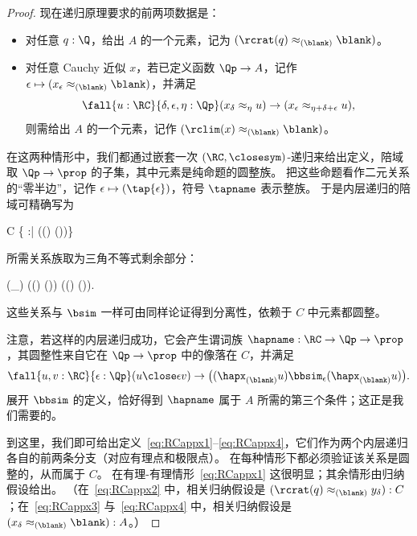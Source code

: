 \begin{proof}
  现在递归原理要求的前两项数据是：
  \begin{itemize}
  \item 对任意 $q:\Q$，给出 $A$ 的一个元素，记为 $(\rcrat(q)\approx_{(\blank)} \blank)$。
  \item 对任意 Cauchy 近似 $x$，若已定义函数 $\Qp \to A$，记作 $\epsilon \mapsto (x_\epsilon \approx_{(\blank)} \blank)$，并满足
    \begin{equation}
      \fall{u:\RC}{\delta,\epsilon,\eta:\Qp} (x_\delta \approx_\eta u) \to (x_\epsilon \approx_{\eta+\delta+\epsilon} u),\label{eq:appxrec2}
    \end{equation}
    则需给出 $A$ 的一个元素，记作 $(\rclim(x)\approx_{(\blank)} \blank)$。
  \end{itemize}
  在这两种情形中，我们都通过嵌套一次 $(\RC,\closesym)$-递归来给出定义，陪域取 $\Qp\to\prop$ 的子集，其中元素是纯命题的圆整族。
  把这些命题看作二元关系的“零半边”，记作 $\epsilon \mapsto (\tap{\epsilon})$，符号 $\tapname$ 表示整族。
  于是内层递归的陪域可精确写为
  \begin{narrowmultline*}
    C 
    \bigg\{ \tapname :\Qp\to\prop \;\;\Big|\;\; \narrowbreak
    \fall{\epsilon:\Qp} \Big((\tap\epsilon) \Leftrightarrow \exis{\theta:\Qp} (\tap{\epsilon-\theta})\Big)\bigg\}
  \end{narrowmultline*}
  所需关系族取为三角不等式剩余部分：
  \begin{narrowmultline*}
    (\tapname \bbsim_\epsilon \tapbname) 
    \fall{\eta:\Qp} ((\tap\eta) \to (\tapb{\epsilon+\eta})) \land
    \narrowbreak
    ((\tapb\eta) \to (\tap{\epsilon+\eta})).
  \end{narrowmultline*}
  这些关系与 $\bsim$ 一样可由同样论证得到分离性，依赖于 $C$ 中元素都圆整。

  注意，若这样的内层递归成功，它会产生谓词族 $\hapname : \RC\to\Qp\to \prop$，其圆整性来自它在 $\Qp\to\prop$ 中的像落在 $C$，并满足
  \[ \fall{u,v:\RC}{\epsilon:\Qp} (u\close\epsilon v) \to \big((\hapx_{(\blank)} u) \bbsim_\epsilon (\hapx_{(\blank)} u)\big). \]
  展开 $\bbsim$ 的定义，恰好得到 $\hapname$ 属于 $A$ 所需的第三个条件；这正是我们需要的。

  到这里，我们即可给出定义~\eqref{eq:RCappx1}--\eqref{eq:RCappx4}，它们作为两个内层递归各自的前两条分支（对应有理点和极限点）。
  在每种情形下都必须验证该关系是圆整的，从而属于 $C$。
  在有理-有理情形~\eqref{eq:RCappx1} 这很明显；其余情形由归纳假设给出。
  （在~\eqref{eq:RCappx2} 中，相关归纳假设是 $(\rcrat(q) \approx_{(\blank)} y_\delta) : C$；在~\eqref{eq:RCappx3} 与~\eqref{eq:RCappx4} 中，相关归纳假设是 $(x_\delta \approx_{(\blank)} \blank) : A$。）


\end{proof}
